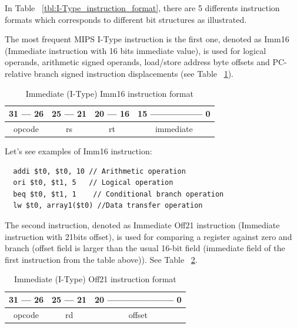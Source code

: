 \documentclass[
  oneside,
  11pt, a4paper,
  footinclude=true,
  headinclude=true,
  cleardoublepage=empty
]{scrbook}
\begin{document}
\newpage

In Table ~\ref{tbl:I-Type_instruction_format}, there are 5 differents instruction formats which corresponds to different bit structures as illustrated.

The most frequent MIPS I-Type instruction is the first one, denoted as Imm16 (Immediate instruction with 16 bits immediate value), is used for logical operands, arithmetic signed operands, load/store address byte offsets and PC-relative branch signed instruction displacements (see Table ~\ref{tbl:imm16_instruction}).

\begin{table}[h!]
\centering
\begin{tabular}{l|l|l|l}
31 --- 26                    & 25 --- 21               & 20 --- 16               & 15 ----------------- 0         \\ \hline
\multicolumn{1}{|c|}{opcode} & \multicolumn{1}{c|}{rs} & \multicolumn{1}{c|}{rt} & \multicolumn{1}{c|}{immediate} \\ \hline
\end{tabular}
\caption{Immediate (I-Type) Imm16 instruction format}
\label{tbl:imm16_instruction}
\end{table}

Let's see examples of Imm16 instruction:

\begin{lstlisting}
  addi $t0, $t0, 10 // Arithmetic operation
  ori $t0, $t1, 5   // Logical operation
  beq $t0, $t1, 1    // Conditional branch operation
  lw $t0, array1($t0) //Data transfer operation
\end{lstlisting}

The second instruction, denoted as Immediate Off21 instruction (Immediate instruction with 21bits offset), is used for comparing a register against zero and branch (offset field is larger than the usual 16-bit field (immediate field of the first instruction from the table above)).
See Table ~\ref{tbl:imm_off21_instruction}.

\begin{table}[h!]
\centering
\begin{tabular}{l|l|l|l}
31 --- 26                    & 25 --- 21               & \multicolumn{2}{l}{20 --------------------- 0} \\ \hline
\multicolumn{1}{|c|}{opcode} & \multicolumn{1}{c|}{rd} & \multicolumn{2}{c|}{offset}                     \\ \hline
\end{tabular}
\caption{Immediate (I-Type) Off21 instruction format}
\label{tbl:imm_off21_instruction}
\end{table} 
\end{document}
